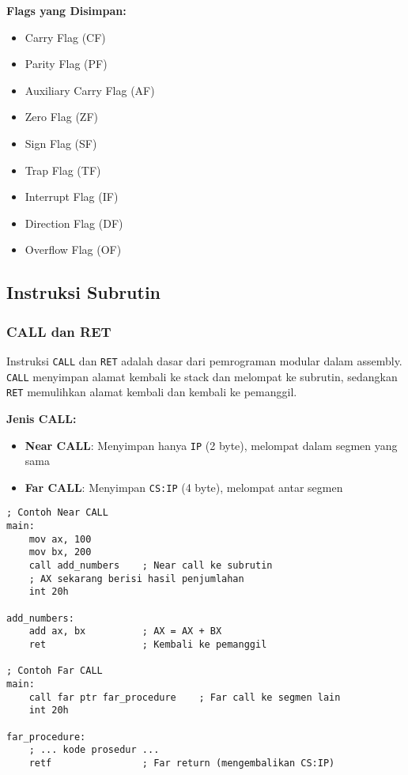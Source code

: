 \documentclass[../main.tex]{subfiles}
\begin{document}
                \textbf{Flags yang Disimpan:}
                \begin{itemize}
                    \item Carry Flag (CF)
                    \item Parity Flag (PF)
                    \item Auxiliary Carry Flag (AF)
                    \item Zero Flag (ZF)
                    \item Sign Flag (SF)
                    \item Trap Flag (TF)
                    \item Interrupt Flag (IF)
                    \item Direction Flag (DF)
                    \item Overflow Flag (OF)
                \end{itemize}

        \subsection{Instruksi Subrutin}
            \subsubsection{CALL dan RET}
                Instruksi \texttt{CALL} dan \texttt{RET} adalah dasar dari pemrograman modular dalam assembly. \texttt{CALL} menyimpan alamat kembali ke stack dan melompat ke subrutin, sedangkan \texttt{RET} memulihkan alamat kembali dan kembali ke pemanggil.

                \textbf{Jenis CALL:}
                \begin{itemize}
                    \item \textbf{Near CALL}: Menyimpan hanya \texttt{IP} (2 byte), melompat dalam segmen yang sama
                    \item \textbf{Far CALL}: Menyimpan \texttt{CS:IP} (4 byte), melompat antar segmen
                \end{itemize}

                \begin{lstlisting}[language={[x86masm]Assembler}, caption=Contoh CALL dan RET, label={lst:call-ret-example}]
; Contoh Near CALL
main:
    mov ax, 100
    mov bx, 200
    call add_numbers    ; Near call ke subrutin
    ; AX sekarang berisi hasil penjumlahan
    int 20h

add_numbers:
    add ax, bx          ; AX = AX + BX
    ret                 ; Kembali ke pemanggil

; Contoh Far CALL
main:
    call far ptr far_procedure    ; Far call ke segmen lain
    int 20h

far_procedure:
    ; ... kode prosedur ...
    retf                ; Far return (mengembalikan CS:IP)
                \end{lstlisting}
\end{document}
